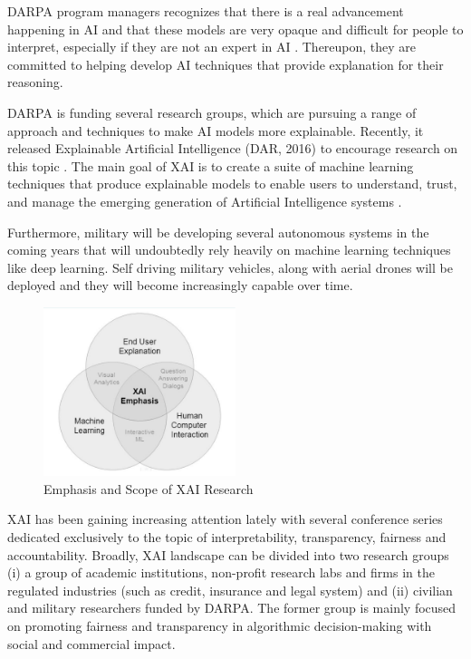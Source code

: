 DARPA program managers recognizes that there is a real advancement happening in AI and that these models are very opaque and difficult for people to interpret, especially if they are not an expert in AI \cite{Knight2017}. Thereupon, they are committed to helping develop AI techniques that provide explanation for their reasoning.

DARPA is funding several research groups, which are pursuing a range of approach and techniques to make AI models more explainable. Recently, it released Explainable Artificial Intelligence (DAR, 2016) to encourage research on this topic \cite{Gunning}. The main goal of XAI is to create a suite of machine learning techniques that produce explainable models to enable users to understand, trust, and manage the emerging generation of Artificial Intelligence systems \cite{Gunning2}.

Furthermore, military will be developing several autonomous systems in the coming years that will undoubtedly rely heavily on machine learning techniques like deep learning. Self driving military vehicles, along with aerial drones will be deployed and they will become increasingly capable over time.

\begin{figure}[htbp]
\centering
\includegraphics[width=0.5\textwidth]{images/XAI-research-1-crop.png}
\caption{Emphasis and Scope of XAI Research}
\label{fig:xai-1}
\end{figure}

XAI has been gaining increasing attention lately with several conference series dedicated exclusively to the topic of interpretability, transparency, fairness and accountability. Broadly, XAI landscape can be divided into two research groups (i) a group of academic institutions, non-profit research labs and firms in the regulated industries (such as credit, insurance and legal system) and (ii) civilian and military researchers funded by DARPA. The former group is mainly focused on promoting fairness and transparency in algorithmic decision-making with social and commercial impact.


